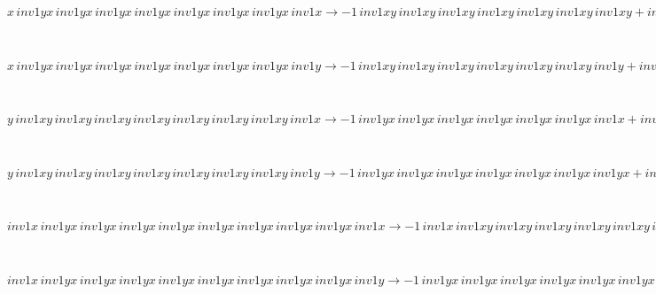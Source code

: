\documentclass[rep10,leqno]{report}
\begin{document}
\begin{minipage}{6in}
$
x\,
 inv1yx\,
 inv1yx\,
 inv1yx\,
 inv1yx\,
 inv1yx\,
 inv1yx\,
 inv1yx\,
 inv1x\rightarrow -1\,
 inv1xy\,
 inv1xy\,
 inv1xy\,
 inv1xy\,
 inv1xy\,
 inv1xy\,
 inv1xy + inv1xy\,
 inv1xy\,
 inv1xy\,
 inv1xy\,
 inv1xy\,
 inv1xy\,
 inv1xy\,
 inv1x
$
\end{minipage}\medskip \\
\begin{minipage}{6in}
$
x\,
 inv1yx\,
 inv1yx\,
 inv1yx\,
 inv1yx\,
 inv1yx\,
 inv1yx\,
 inv1yx\,
 inv1y\rightarrow -1\,
 inv1xy\,
 inv1xy\,
 inv1xy\,
 inv1xy\,
 inv1xy\,
 inv1xy\,
 inv1y + inv1xy\,
 inv1xy\,
 inv1xy\,
 inv1xy\,
 inv1xy\,
 inv1xy\,
 inv1xy\,
 inv1y + x\,
 inv1yx\,
 inv1yx\,
 inv1yx\,
 inv1yx\,
 inv1yx\,
 inv1yx\,
 inv1yx
$
\end{minipage}\medskip \\
\begin{minipage}{6in}
$
y\,
 inv1xy\,
 inv1xy\,
 inv1xy\,
 inv1xy\,
 inv1xy\,
 inv1xy\,
 inv1xy\,
 inv1x\rightarrow -1\,
 inv1yx\,
 inv1yx\,
 inv1yx\,
 inv1yx\,
 inv1yx\,
 inv1yx\,
 inv1x + inv1yx\,
 inv1yx\,
 inv1yx\,
 inv1yx\,
 inv1yx\,
 inv1yx\,
 inv1yx\,
 inv1x + y\,
 inv1xy\,
 inv1xy\,
 inv1xy\,
 inv1xy\,
 inv1xy\,
 inv1xy\,
 inv1xy
$
\end{minipage}\medskip \\
\begin{minipage}{6in}
$
y\,
 inv1xy\,
 inv1xy\,
 inv1xy\,
 inv1xy\,
 inv1xy\,
 inv1xy\,
 inv1xy\,
 inv1y\rightarrow -1\,
 inv1yx\,
 inv1yx\,
 inv1yx\,
 inv1yx\,
 inv1yx\,
 inv1yx\,
 inv1yx + inv1yx\,
 inv1yx\,
 inv1yx\,
 inv1yx\,
 inv1yx\,
 inv1yx\,
 inv1yx\,
 inv1y
$
\end{minipage}\medskip \\
\begin{minipage}{6in}
$
inv1x\,
 inv1yx\,
 inv1yx\,
 inv1yx\,
 inv1yx\,
 inv1yx\,
 inv1yx\,
 inv1yx\,
 inv1yx\,
 inv1x\rightarrow -1\,
 inv1x\,
 inv1xy\,
 inv1xy\,
 inv1xy\,
 inv1xy\,
 inv1xy\,
 inv1xy\,
 inv1xy\,
 inv1xy + inv1yx\,
 inv1yx\,
 inv1yx\,
 inv1yx\,
 inv1yx\,
 inv1yx\,
 inv1yx\,
 inv1yx\,
 inv1x + inv1x\,
 inv1xy\,
 inv1xy\,
 inv1xy\,
 inv1xy\,
 inv1xy\,
 inv1xy\,
 inv1xy\,
 inv1xy\,
 inv1x
$
\end{minipage}\medskip \\
\begin{minipage}{6in}
$
inv1x\,
 inv1yx\,
 inv1yx\,
 inv1yx\,
 inv1yx\,
 inv1yx\,
 inv1yx\,
 inv1yx\,
 inv1yx\,
 inv1y\rightarrow -1\,
 inv1yx\,
 inv1yx\,
 inv1yx\,
 inv1yx\,
 inv1yx\,
 inv1yx\,
 inv1yx\,
 inv1yx - inv1x\,
 inv1xy\,
 inv1xy\,
 inv1xy\,
 inv1xy\,
 inv1xy\,
 inv1xy\,
 inv1xy\,
 inv1y + inv1x\,
 inv1yx\,
 inv1yx\,
 inv1yx\,
 inv1yx\,
 inv1yx\,
 inv1yx\,
 inv1yx\,
 inv1yx + inv1yx\,
 inv1yx\,
 inv1yx\,
 inv1yx\,
 inv1yx\,
 inv1yx\,
 inv1yx\,
 inv1yx\,
 inv1y + inv1x\,
 inv1xy\,
 inv1xy\,
 inv1xy\,
 inv1xy\,
 inv1xy\,
 inv1xy\,
 inv1xy\,
 inv1xy\,
 inv1y
$
\end{minipage}\medskip \\
\end{document}
